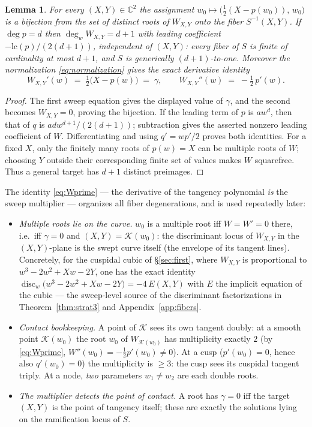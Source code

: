 \documentclass[11pt]{article}
\numberwithin{equation}{section}
\theoremstyle{plain}
\newtheorem{lemma}[theorem]{Lemma}
\theoremstyle{definition}
\theoremstyle{remark}
\newcommand{\C}{\mathbb{C}}
\begin{document}
\begin{lemma}\label{lem:fibroots}
For every $(X,Y)\in\C^2$ the assignment
$w_0\mapsto\bigl(\tfrac12(X-p(w_0)),\,w_0\bigr)$ is a bijection from the set
of distinct roots of $W_{X,Y}$ onto the fiber $S^{-1}(X,Y)$. If $\deg p=d$
then $\deg_wW_{X,Y}=d+1$ with leading coefficient
$-\mathrm{lc}(p)/(2(d+1))$, independent of $(X,Y)$: every fiber of $S$ is
finite of cardinality at most $d+1$, and $S$ is generically $(d+1)$-to-one.
Moreover the normalization \eqref{eq:normalization} gives the exact derivative
identity
\begin{equation}\label{eq:Wprime}
W_{X,Y}'(w)\;=\;\tfrac12\bigl(X-p(w)\bigr)\;=\;\gamma ,
\qquad
W_{X,Y}''(w)\;=\;-\tfrac12\,p'(w) .
\end{equation}
\end{lemma}
\begin{proof}
The first sweep equation gives the displayed value of $\gamma$, and the
second becomes $W_{X,Y}=0$, proving the bijection. If the leading term
of $p$ is $aw^d$, then that of $q$ is $adw^{d+1}/(2(d+1))$;
subtraction gives the asserted nonzero leading coefficient of $W$.
Differentiating and using $q'=wp'/2$ proves both identities.
For a fixed $X$, only the finitely many roots of $p(w)=X$ can be
multiple roots of $W$; choosing $Y$ outside their corresponding finite
set of values makes $W$ squarefree. Thus a general target has $d+1$
distinct preimages.
\end{proof}

The identity \eqref{eq:Wprime} --- the derivative of the tangency polynomial
\emph{is} the sweep multiplier --- organizes all fiber degenerations, and is
used repeatedly later:
\begin{itemize}
\item \emph{Multiple roots lie on the curve.} $w_0$ is a multiple root iff
$W=W'=0$ there, i.e.\ iff $\gamma=0$ and $(X,Y)=\mathcal K(w_0)$: the
discriminant locus of $W_{X,Y}$ in the $(X,Y)$-plane is the swept curve
itself (the envelope of its tangent lines). Concretely, for the cuspidal cubic
of \S\ref{sec:first}, where $W_{X,Y}$ is proportional to $w^3-2w^2+Xw-2Y$,
one has the exact identity
$\operatorname{disc}_w\bigl(w^3-2w^2+Xw-2Y\bigr)=-4\,E(X,Y)$ with $E$ the
implicit equation of the cubic --- the sweep-level source of the discriminant
factorizations in Theorem~\ref{thm:strat3} and Appendix~\ref{app:fibers}.
\item \emph{Contact bookkeeping.} A point of $\mathcal K$ sees its own
tangent doubly: at a smooth point $\mathcal K(w_0)$ the root $w_0$ of
$W_{\mathcal K(w_0)}$ has multiplicity exactly $2$ (by \eqref{eq:Wprime},
$W''(w_0)=-\tfrac12p'(w_0)\neq0$). At a cusp ($p'(w_0)=0$, hence also
$q'(w_0)=0$) the multiplicity is $\ge3$: the cusp sees its cuspidal tangent
triply. At a node, \emph{two} parameters $w_1\neq w_2$ are each double roots.
\item \emph{The multiplier detects the point of contact.} A root has
$\gamma=0$ iff the target $(X,Y)$ is the point of tangency itself; these are
exactly the solutions lying on the ramification locus of $S$.
\end{itemize}
\end{document}
